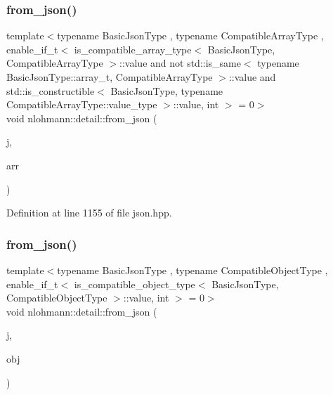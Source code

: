 \subsubsection{\texorpdfstring{from\+\_\+json()}{from\_json()}\hspace{0.1cm}{\footnotesize\ttfamily [12/18]}}
{\footnotesize\ttfamily template$<$typename Basic\+Json\+Type , typename Compatible\+Array\+Type , enable\+\_\+if\+\_\+t$<$ is\+\_\+compatible\+\_\+array\+\_\+type$<$ Basic\+Json\+Type, Compatible\+Array\+Type $>$\+::value and not std\+::is\+\_\+same$<$ typename Basic\+Json\+Type\+::array\+\_\+t, Compatible\+Array\+Type $>$\+::value and std\+::is\+\_\+constructible$<$ Basic\+Json\+Type, typename Compatible\+Array\+Type\+::value\+\_\+type $>$\+::value, int $>$  = 0$>$ \\
void nlohmann\+::detail\+::from\+\_\+json (\begin{DoxyParamCaption}\item[{const Basic\+Json\+Type \&}]{j,  }\item[{Compatible\+Array\+Type \&}]{arr }\end{DoxyParamCaption})}



Definition at line 1155 of file json.\+hpp.

\mbox{\label{namespacenlohmann_1_1detail_a5e7a3674e8ac46f8feebad9712d7c55f}} 
\subsubsection{\texorpdfstring{from\+\_\+json()}{from\_json()}\hspace{0.1cm}{\footnotesize\ttfamily [13/18]}}
{\footnotesize\ttfamily template$<$typename Basic\+Json\+Type , typename Compatible\+Object\+Type , enable\+\_\+if\+\_\+t$<$ is\+\_\+compatible\+\_\+object\+\_\+type$<$ Basic\+Json\+Type, Compatible\+Object\+Type $>$\+::value, int $>$  = 0$>$ \\
void nlohmann\+::detail\+::from\+\_\+json (\begin{DoxyParamCaption}\item[{const Basic\+Json\+Type \&}]{j,  }\item[{Compatible\+Object\+Type \&}]{obj }\end{DoxyParamCaption})}



